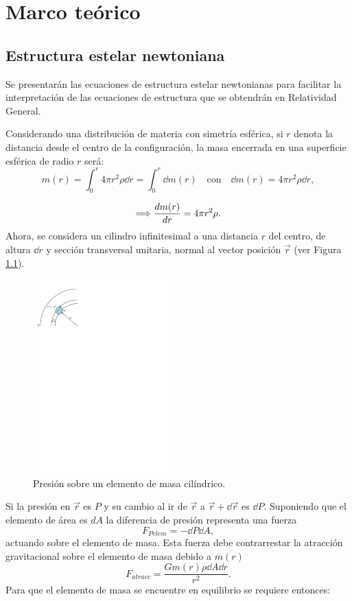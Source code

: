 \chapter{Marco teórico}

\section{Estructura estelar newtoniana}
Se presentarán las ecuaciones de estructura estelar newtonianas para facilitar la interpretación de las ecuaciones de estructura que se obtendrán en Relatividad General.

Considerando una distribución de materia con simetría esférica, si $r$ denota la distancia desde el centro de la configuración, la masa encerrada en una superficie esférica de radio $r$ será:  
\begin{equation}
    m ( r ) = \int _ { 0 } ^ { r } 4 \pi r ^ { 2 } \rho \dd{r} = \int_{0}^{r} \dd{m(r)} \quad\text{con}\quad \dd{m(r)}=4\pi r^2\rho \dd{r},
    \label{mN}
\end{equation}

\begin{equation}
    \Longrightarrow\dv{m(r)}{r} =4\pi r^2 \rho.
    \label{dmnewton}
\end{equation}
Ahora, se considera un cilindro infinitesimal a una distancia $r$ del centro, de altura $\dd{r}$ y sección transversal unitaria, normal al vector posición $\vec{r}$ (ver Figura \ref{stellnew}).  

\begin{figure}[H]
    \centering
    \includegraphics[width=150pt]{figures/stellarnewton.pdf}
    \caption{Presión sobre un elemento de masa cilíndrico.}
    \label{stellnew}
\end{figure}
Si la presión en $\vec{r}$ es $P$ y su cambio al ir de $\vec{r}$ a $\vec{r}+\dd{\vec{r}}$ es $\dd{P}$. Suponiendo que el elemento de área es $dA$ la diferencia de presión representa una fuerza 
\begin{equation*}
    F_{Pelem}=-\dd{P}\dd{A},
\end{equation*}
actuando sobre el elemento de masa. Esta fuerza debe contrarrestar la atracción gravitacional sobre el elemento de masa debido a $m(r)$
\begin{equation*}
    F_{atracc}=\frac{G m(r)\rho \dd{A} \dd{r}}{r^2}.
\end{equation*}
Para que el elemento de masa se encuentre en equilibrio se requiere entonces:

